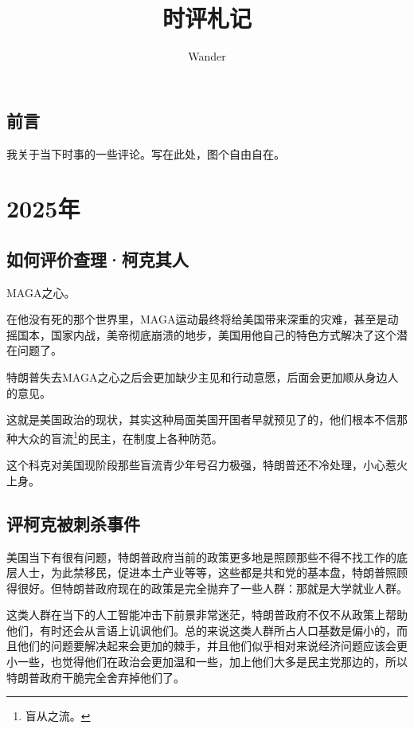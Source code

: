 \documentclass[12pt,oneside]{book}
\title{时评札记}
\author{Wander}
\begin{document}
\makemytitle



\frontmatter 
{}
\chapter*{前言}
我关于当下时事的一些评论。写在此处，图个自由自在。



\setcounter{tocdepth}{2}    
\tableofcontents


\mainmatter


\part{2025年}
\chapter{如何评价查理·柯克其人}
MAGA之心。

在他没有死的那个世界里，MAGA运动最终将给美国带来深重的灾难，甚至是动摇国本，国家内战，美帝彻底崩溃的地步，美国用他自己的特色方式解决了这个潜在问题了。

特朗普失去MAGA之心之后会更加缺少主见和行动意愿，后面会更加顺从身边人的意见。

这就是美国政治的现状，其实这种局面美国开国者早就预见了的，他们根本不信那种大众的盲流\footnote{盲从之流。}的民主，在制度上各种防范。

这个科克对美国现阶段那些盲流青少年号召力极强，特朗普还不冷处理，小心惹火上身。



\chapter{评柯克被刺杀事件}
美国当下有很有问题，特朗普政府当前的政策更多地是照顾那些不得不找工作的底层人士，为此禁移民，促进本土产业等等，这些都是共和党的基本盘，特朗普照顾得很好。但特朗普政府现在的政策是完全抛弃了一些人群：那就是大学就业人群。

这类人群在当下的人工智能冲击下前景非常迷茫，特朗普政府不仅不从政策上帮助他们，有时还会从言语上讥讽他们。总的来说这类人群所占人口基数是偏小的，而且他们的问题要解决起来会更加的棘手，并且他们似乎相对来说经济问题应该会更小一些，也觉得他们在政治会更加温和一些，加上他们大多是民主党那边的，所以特朗普政府干脆完全舍弃掉他们了。
\end{document}

